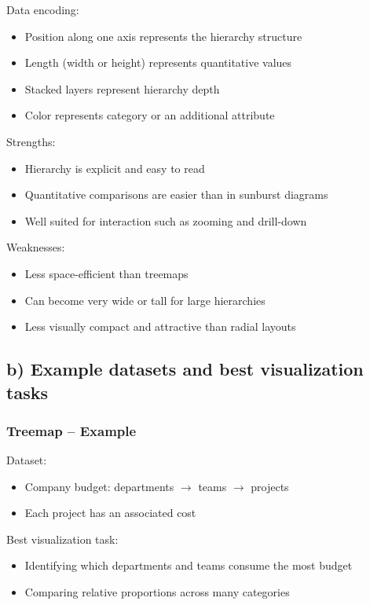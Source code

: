 \begin{exercise}
        Data encoding:
        \begin{itemize}
            \item Position along one axis represents the hierarchy structure
            \item Length (width or height) represents quantitative values
            \item Stacked layers represent hierarchy depth
            \item Color represents category or an additional attribute
        \end{itemize}

        Strengths:
        \begin{itemize}
            \item Hierarchy is explicit and easy to read
            \item Quantitative comparisons are easier than in sunburst diagrams
            \item Well suited for interaction such as zooming and drill-down
        \end{itemize}

        Weaknesses:
        \begin{itemize}
            \item Less space-efficient than treemaps
            \item Can become very wide or tall for large hierarchies
            \item Less visually compact and attractive than radial layouts
        \end{itemize}

        \subsection*{b) Example datasets and best visualization tasks}

        \subsubsection*{Treemap -- Example}

        Dataset:
        \begin{itemize}
            \item Company budget: departments $\rightarrow$ teams $\rightarrow$ projects
            \item Each project has an associated cost
        \end{itemize}

        Best visualization task:
        \begin{itemize}
            \item Identifying which departments and teams consume the most budget
            \item Comparing relative proportions across many categories
        \end{itemize}


\end{exercise}
